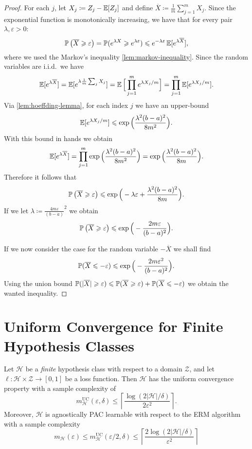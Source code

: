 \begin{proof}
For each \(j\), let \(X_j \coloneq Z_j - \operatorname{\mathbb{E}}[Z_j]\) and define
\(\overline{X} \coloneq \frac{1}{m} \sum_{j=1}^m X_j\). Since the exponential
function is monotonically increasing, we have that for every pair
\(\lambda, \varepsilon > 0\):
\[
\operatorname{\mathbb{P}}\big( \overline{X} \geqslant \varepsilon \big)
= \operatorname{\mathbb{P}}(e^{\lambda X} \geqslant e^{\lambda \varepsilon})
\leqslant e^{-\lambda \varepsilon} \operatorname{\mathbb{E}}[e^{\lambda \overline X}],
\]
where we used the Markov's inequality \cref{lem:markov-inequality}. Since the
random variables are i.i.d.~we have
\[
\operatorname{\mathbb{E}}[e^{\lambda \overline X}]
= \operatorname{\mathbb{E}}[e^{\lambda \frac{1}{m} \sum_j X_j}]
= \operatorname{\mathbb{E}}\Big[ \prod_{j=1}^m e^{\lambda X_j/m} \Big]
= \prod_{j=1}^m \operatorname{\mathbb{E}}[e^{\lambda X_j/m}].
\]
Via \cref{lem:hoeffding-lemma}, for each index \(j\) we have an upper-bound
\[
\operatorname{\mathbb{E}}[e^{\lambda X_j/m}] \leqslant \exp\Big( \frac{\lambda^2 (b - a)^2}{8 m^2} \Big).
\]
With this bound in hands we obtain
\[
\operatorname{\mathbb{E}}[e^{\lambda \overline X}]
= \prod_{j=1}^m \exp\Big( \frac{\lambda^2 (b - a)^2}{8 m^2} \Big)
= \exp\Big( \frac{\lambda^2 (b - a)^2}{8 m} \Big).
\]
Therefore it follows that
\[
\operatorname{\mathbb{P}}\big( \overline X \geqslant \varepsilon \big)
\leqslant \exp\Big(-\lambda \varepsilon + \frac{\lambda^2 (b - a)^2}{8 m} \Big).
\]
If we let \(\lambda \coloneq \frac{4 m \varepsilon}{(b-a)}^2\) we obtain
\[
\operatorname{\mathbb{P}}\big( \overline X \geqslant \varepsilon \big)
\leqslant \exp\Big( -\frac{2 m \varepsilon}{(b - a)^2} \Big).
\]

If we now consider the case for the random variable \(-\overline{X}\) we shall
find
\[
\operatorname{\mathbb{P}}(\overline X \leqslant -\varepsilon)
\leqslant \exp\Big( -\frac{2 m \varepsilon^{2}}{(b-a)^2} \Big).
\]
Using the union bound
\(\operatorname{\mathbb{P}}(|\overline X| \geqslant \varepsilon) \leqslant \operatorname{\mathbb{P}}(\overline X \geqslant \varepsilon)
+ \operatorname{\mathbb{P}}(\overline X \leqslant - \varepsilon)\) we obtain the wanted inequality.
\end{proof}

\section{Uniform Convergence for Finite Hypothesis Classes}

\begin{proposition}
\label{prop:finite-hypothesis-agnostically-pac-learnable}
Let \(\mathcal{H}\) be a \emph{finite} hypothesis class with respect to a domain
\(\mathcal{Z}\), and let \(\ell: \mathcal{H} \times \mathcal{Z} \to [0, 1]\) be
a loss function. Then \(\mathcal{H}\) has the uniform convergence property with
a sample complexity of
\[
m_{\mathcal{H}}^{\text{UC}}(\varepsilon, \delta) \leq
\left\lceil \frac{\log(2 |\mathcal{H}| / \delta)}{2 \varepsilon^2} \right\rceil.
\]
Moreover, \(\mathcal{H}\) is agnostically PAC learnable with respect to the ERM
algorithm with a sample complexity
\[
m_{\mathcal{H}}(\varepsilon) \leq m_{\mathcal{H}}^{\text{UC}}(\varepsilon/2, \delta)
\leq
\left\lceil \frac{2 \log(2 |\mathcal{H}| / \delta)}{\varepsilon^2} \right\rceil
\]
\end{proposition}

